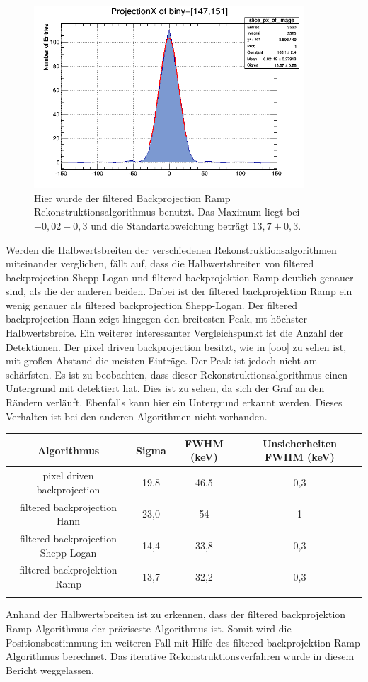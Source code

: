 \begin{figure}[h!]
	\centering
	\includegraphics[width=0.9\textwidth]{Ramp-Filter.png}
	\caption{Hier wurde der filtered Backprojection Ramp Rekonstruktionsalgorithmus benutzt. Das Maximum liegt bei $-0,02 \pm 0,3$ und die Standartabweichung beträgt $13,7 \pm 0,3$.}
	\label{oor}
\end{figure}
Werden die Halbwertsbreiten der verschiedenen Rekonstruktionsalgorithmen miteinander verglichen, fällt auf, dass die Halbwertsbreiten von filtered backprojection Shepp-Logan und filtered backprojektion Ramp deutlich genauer sind, als die der anderen beiden.
Dabei ist der filtered backprojektion Ramp ein wenig genauer als filtered backprojection Shepp-Logan. Der filtered backprojection Hann zeigt hingegen  den breitesten Peak, mt höchster Halbwertsbreite.
Ein weiterer interessanter Vergleichspunkt ist die Anzahl der Detektionen. Der pixel driven backprojection besitzt, wie in \cref{ooo} zu sehen ist, mit großen Abstand die meisten Einträge. Der Peak ist jedoch nicht am schärfsten. Es ist zu beobachten, dass dieser Rekonstruktionsalgorithmus einen Untergrund mit detektiert hat. Dies ist zu sehen, da sich der Graf an den Rändern verläuft. Ebenfalls kann hier ein Untergrund erkannt werden. Dieses Verhalten ist bei den anderen Algorithmen nicht vorhanden.
\begin{tabular}{|c|c|c|c|}
	\hline 
	Algorithmus & Sigma & FWHM (keV) & Unsicherheiten FWHM (keV) \\ 
	\hline 
	pixel driven backprojection & 19,8 & 46,5 & 0,3 \\ 
	\hline 
	filtered backprojection Hann & 23,0 & 54 & 1  \\ 
	\hline 
	filtered backprojection Shepp-Logan & 14,4 & 33,8 & 0,3 \\ 
	\hline 
	filtered backprojektion Ramp & 13,7 & 32,2 & 0,3 \\ 
	\hline 
	\label{oot}
\end{tabular} 
Anhand der Halbwertsbreiten ist zu erkennen, dass der filtered backprojektion Ramp Algorithmus der präziseste Algorithmus ist. Somit wird die Positionsbestimmung im weiteren Fall mit Hilfe des filtered backprojektion Ramp Algorithmus berechnet.
Das iterative Rekonstruktionsverfahren wurde in diesem Bericht weggelassen.

